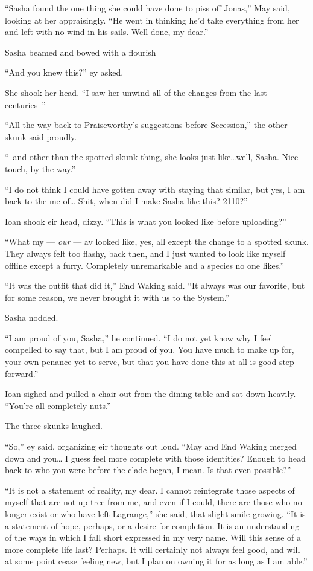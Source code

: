 ``Sasha found the one thing she could have done to piss off Jonas,'' May said, looking at her appraisingly. ``He went in thinking he'd take everything from her and left with no wind in his sails. Well done, my dear.''

Sasha beamed and bowed with a flourish

``And you knew this?'' ey asked.

She shook her head. ``I saw her unwind all of the changes from the last centuries--''

``All the way back to Praiseworthy's suggestions before Secession,'' the other skunk said proudly.

``--and other than the spotted skunk thing, she looks just like\ldots well, Sasha. Nice touch, by the way.''

``I do not think I could have gotten away with staying that similar, but yes, I am back to the me of\ldots{} Shit, when did I make Sasha like this? 2110?''

Ioan shook eir head, dizzy. ``This is what you looked like before uploading?''

``What my — \emph{our} — av looked like, yes, all except the change to a spotted skunk. They always felt too flashy, back then, and I just wanted to look like myself offline except a furry. Completely unremarkable and a species no one likes.''

``It was the outfit that did it,'' End Waking said. ``It always was our favorite, but for some reason, we never brought it with us to the System.''

Sasha nodded.

``I am proud of you, Sasha,'' he continued. ``I do not yet know why I feel compelled to say that, but I am proud of you. You have much to make up for, your own penance yet to serve, but that you have done this at all is good step forward.''

Ioan sighed and pulled a chair out from the dining table and sat down heavily. ``You're all completely nuts.''

The three skunks laughed.

``So,'' ey said, organizing eir thoughts out loud. ``May and End Waking merged down and you\ldots{} I guess feel more complete with those identities? Enough to head back to who you were before the clade began, I mean. Is that even possible?''

``It is not a statement of reality, my dear. I cannot reintegrate those aspects of myself that are not up-tree from me, and even if I could, there are those who no longer exist or who have left Lagrange,'' she said, that slight smile growing. ``It is a statement of hope, perhaps, or a desire for completion. It is an understanding of the ways in which I fall short expressed in my very name. Will this sense of a more complete life last? Perhaps. It will certainly not always feel good, and will at some point cease feeling new, but I plan on owning it for as long as I am able.''

